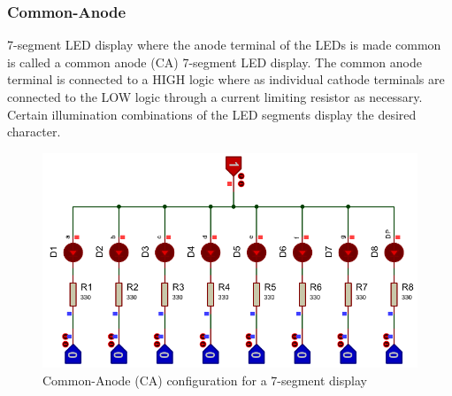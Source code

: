 \documentclass{lab_sheet}
\begin{document}
        \subsubsection*{Common-Anode}
        7-segment LED display where the anode terminal of the LEDs is made common is called a common anode (CA) 7-segment LED display. The common anode terminal is connected to a HIGH logic where as individual cathode terminals are connected to the LOW logic through a current limiting resistor as necessary. Certain illumination combinations of the LED segments display the desired character.
        \begin{figure}[H]
            \centering
            \includegraphics[scale=1]{../Figures/led2}
            \caption{Common-Anode (CA) configuration for a 7-segment display}
            \label{fig:ca}
            \end{figure}
\end{document}
